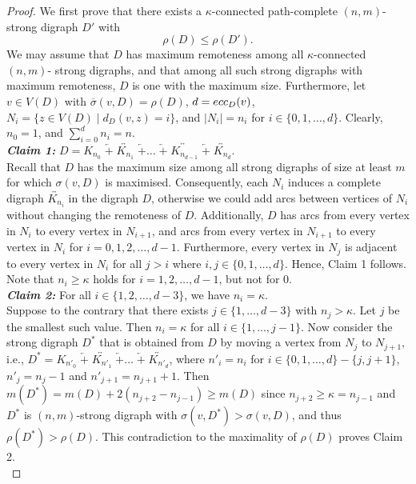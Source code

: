 \documentclass[10pt,a4paper]{amsart}
\begin{document}
	\begin{proof}
We first prove that there exists a $\kappa$-connected path-complete $(n,m)$- strong digraph $D'$ with 
\begin{equation} \label{eq:exists-pc-kappa-digraph}
\rho(D) \leq \rho(D'). 
\end{equation}
We may assume that $D$ has maximum remoteness among all $\kappa$-connected $(n,m)$- strong digraphs, and that among all such strong digraphs with maximum remoteness, $D$ is one with the maximum size. Furthermore, let $v \in V(D)$ with $\overline{\sigma}(v,D) = \rho(D)$, $d = {\rm ecc}_D(v)$, $N_{i} = \{z \in V(D) \mid d_{D}(v,z) = i \}$, and $|N_{i}| = n_i$ for $i \in \{0, 1, \ldots, d\}$. Clearly, $n_0 = 1$,  and $\sum_{i=0}^{d} n_i = n$. \\

\emph{{\bf Claim 1:}} $D=K_{n_0} \; \overleftarrow{+} \; \overleftrightarrow{K_{n_1}} \; \overleftarrow{+} \ldots \; \overleftarrow{+} \;  \overleftrightarrow{K_{n_{d-1}}} \; \overleftarrow{+} \; \overleftrightarrow{K_{n_{d}}}$. \\
 
Recall that \( D \) has the maximum size among all strong digraphs of size at least \( m \) for which \( \sigma(v, D) \) is maximised. Consequently, each \( N_i \) induces a complete digraph \( \overleftrightarrow{K_{n_i}} \) in the digraph \( D \), otherwise we could add arcs between vertices of $N_i$ without changing the remoteness of $D$. Additionally, \( D \) has arcs from every vertex in \( N_i \) to every vertex in \( N_{i+1} \), and arcs from every vertex in \( N_{i+1} \) to every vertex in \( N_i \) for \( i = 0, 1, 2, \ldots, d-1 \). Furthermore, every vertex in \( N_j \) is adjacent to every vertex in \( N_i \) for all \( j > i \) where \( i, j \in \{0, 1, \ldots, d\} \). Hence, Claim 1 follows. \\

Note that $n_i \geq \kappa$ holds for $i=1,2,\ldots,d-1$, but not for $0$.\\

\emph{{\bf Claim 2:}} For all $ i \in \{1,2, \ldots, d-3\} $, we have $ n_i = \kappa $. \\

Suppose to the contrary that there exists $ j \in \{1,\ldots,d-3\} $ with $ n_{j}>\kappa $. Let $j$ be the smallest such value. Then $n_{i} = \kappa$ for all $ i \in \{1,\ldots,j-1\} $. Now consider the strong digraph $D^*$ that is obtained from $D$ by moving a vertex from $N_j$ to $N_{j+1}$, i.e., $D^*=K_{n'_0} \; \overleftarrow{+} \; \overleftrightarrow{K_{n'_1}} \; \overleftarrow{+} \ldots \; \overleftarrow{+} \; \overleftrightarrow{K_{n'_d}}$, where
$n'_i=n_i$ for $i \in \{0,1,\ldots,d\} - \{j,j+1\}$,  
$n'_j=n_j-1$ and $n'_{j+1}= n_{j+1}+1$. Then $m(D^*) = m(D) + 2(n_{j+2} - n_{j-1}) \geq m(D)$ since $n_{j+2} \geq \kappa=n_{j-1}$ and $D^{*}$ is $(n,m)$-strong digraph with $\sigma(v,D^{*}) > \sigma (v,D)$, and thus $\rho(D^{*}) > \rho(D)$. This contradiction to the maximality of $\rho(D)$ proves Claim 2.  \\


\end{proof}
\end{document}
